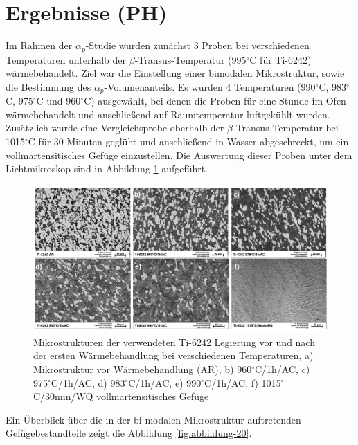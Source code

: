 \section{Ergebnisse (PH)}

Im Rahmen der $\alpha_p$-Studie wurden zunächst 3 Proben bei verschiedenen Temperaturen unterhalb der $\beta$-Transus-Temperatur (995$^\circ$C für Ti-6242) wärmebehandelt. Ziel war die Einstellung einer bimodalen Mikrostruktur, sowie die Bestimmung des $\alpha_p$-Volumenanteils. Es wurden 4 Temperaturen (990$^\circ$C, 983$^\circ$C, 975$^\circ$C und 960$^\circ$C) ausgewählt, bei denen die Proben für eine Stunde im Ofen wärmebehandelt und anschließend auf Raumtemperatur luftgekühlt wurden. Zusätzlich wurde eine Vergleichsprobe oberhalb der $\beta$-Transus-Temperatur bei 1015$^\circ$C für 30 Minuten geglüht und anschließend in Wasser abgeschreckt, um ein vollmartensitisches Gefüge einzustellen. Die Auswertung dieser Proben unter dem Lichtmikroskop sind in Abbildung \ref{fig:abbildung-8} aufgeführt. 

\begin{figure}
	\centering
	\includegraphics[width=1.0\linewidth]{./Bilder/Abbildung 8.png}
	\caption[Abbildung 8]{Mikrostrukturen der verwendeten Ti-6242 Legierung vor und nach der ersten Wärmebehandlung bei verschiedenen Temperaturen, a) Mikrostruktur vor Wärmebehandlung (AR), b) 960$^\circ$C/1h/AC, c) 975$^\circ$C/1h/AC, d) 983$^\circ$C/1h/AC, e) 990$^\circ$C/1h/AC, f) 1015$^\circ$C/30min/WQ vollmartensitisches Gefüge}
	\label{fig:abbildung-8}
\end{figure}

Ein Überblick über die in der bi-modalen Mikrostruktur auftretenden Gefügebestandteile zeigt die Abbildung \ref{fig:abbildung-20}.

